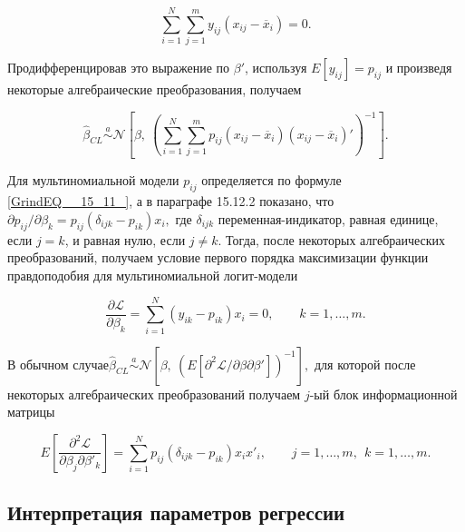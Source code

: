 \begin{equation} \label{GrindEQ__15_14_} \sum^N_{i=1}{\sum^m_{j=1}{y_{ij}\left(x_{ij}-{\overline{x}}_i\right)=0.}} \end{equation} 

Продифференцировав это выражение по $\beta '$, используя $E\left[y_{ij}\right]=p_{ij}$ и произведя некоторые алгебраические преобразования, получаем

\begin{equation} \label{GrindEQ__15_15_} {\widehat{\beta }}_{CL}\overset{a}{\sim }
{\mathcal N}\left[\beta ,\ {\left(\sum^N_{i=1}{\sum^m_{j=1}{p_{ij}}}\left(x_{ij}-{\overline{x}}_i\right)\left(x_{ij}-{\overline{x}}_i\right)'\right)}^{-1}\right]. \end{equation} 

Для мультиномиальной модели $p_{ij}$ определяется по формуле \eqref{GrindEQ__15_11_}, а в параграфе 15.12.2 показано, что ${\partial p_{ij}}/{\partial {\beta }_k}=p_{ij}\left({\delta }_{ijk}-p_{ik}\right)x_i,$ где ${\delta }_{ijk}$ переменная-индикатор, равная единице, если $j=k$, и равная нулю, если $j\ne k.$ Тогда, после некоторых алгебраических преобразований, получаем условие первого порядка максимизации функции правдоподобия для мультиномиальной логит-модели

\begin{equation} \label{GrindEQ__15_16_} \frac{\partial {\mathcal L}}{\partial {\beta }_k}=\sum^N_{i=1}{\left(y_{ik}-p_{ik}\right)x_i=0,\ \ \ \ \ \ \ \ \ k=1,\dots ,m.} \end{equation} 

В обычном случае${\widehat{\beta }}_{CL}\overset{a}{\sim }
{\mathcal N}\left[\beta ,\ {\left(E\left[{{\partial }^2{\mathcal L}}/{\partial\beta \partial{\beta }'}\right]\right)}^{-1}\right],$ для которой после некоторых алгебраических преобразований получаем $j$-ый блок информационной матрицы

\begin{equation} \label{GrindEQ__15_17_} E\left[\frac{{\partial }^2{\mathcal L}}{\partial {\beta }_j\partial {\beta }'_k}\right]=\sum^N_{i=1}{p_{ij}\left({\delta }_{ijk}-p_{ik}\right)x_ix'_i},\ \ \ \ \ \ \ \ \ j=1,\dots ,m,\ \ k=1,\dots ,m. \end{equation} 

\subsection{Интерпретация параметров регрессии}

